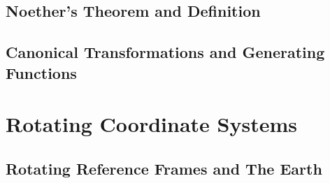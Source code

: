 \documentclass[12pt,%
               a4paper]{physics_notes}
\begin{document}
\subsection{Noether's Theorem and Definition} %
\subsection{Canonical Transformations and Generating Functions}

\section{Rotating Coordinate Systems}
\subsection{Rotating Reference Frames and The Earth}

 
\end{document}
